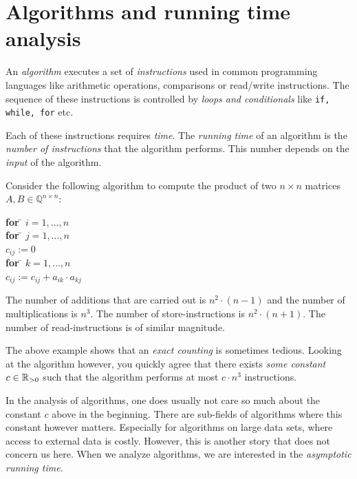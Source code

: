 \chapter{Algorithms and running time analysis} 
\label{cha:runn-time-analys}



An \emph{algorithm} executes a set of \emph{instructions}
used in common programming languages like  arithmetic
operations, comparisons or read/write instructions. The sequence of these instructions is controlled by \emph{loops and conditionals} like {\tt if, while, for} etc. 

Each of these instructions requires \emph{time}. The \emph{running time} of an algorithm is the \emph{number of instructions} that the algorithm performs. This number depends on the \emph{input} of the algorithm. 


\begin{example}
\label{ex-a-1}
  Consider the following algorithm to compute the product of two $n × n$ matrices $A,B ∈ ℚ^{n ×n}$: 
    \begin{tabbing}            
    {\bf for} \= $i=1,\dots,n$ \\ 
              \> {\bf for} \= $j=1,\dots,n$ \\
              \> \> $c_{ij} := 0$ \\
              \> \> {\bf for} \= $k=1,\dots,n$ \\
              \> \> \> $c_{ij} := c_{ij} + a_{ik} ⋅ a_{kj}$
            \end{tabbing} 
%
 The number of additions that are carried out is $n^2 ⋅ (n-1)$ and the number of multiplications is $n^3$.
 The number of store-instructions is $n^2 ⋅(n+1)$. The number of read-instructions is of similar magnitude. 
\end{example}


The above example shows that an \emph{exact counting} is sometimes
tedious. Looking at the algorithm however, you quickly agree that
there exists \emph{some constant} $c \in \mathbb{R}_{>0}$ such that the
algorithm performs at most $c ⋅ n^3$ instructions. 

In the analysis of algorithms, one does usually not care so much about the constant $c$ above in the beginning. There are sub-fields of algorithms where this constant however matters. Especially for algorithms on large data sets, where access to external data is costly. However, this is another story that does not concern us here. When we analyze algorithms, we are interested in the \emph{asymptotic running time}. 

